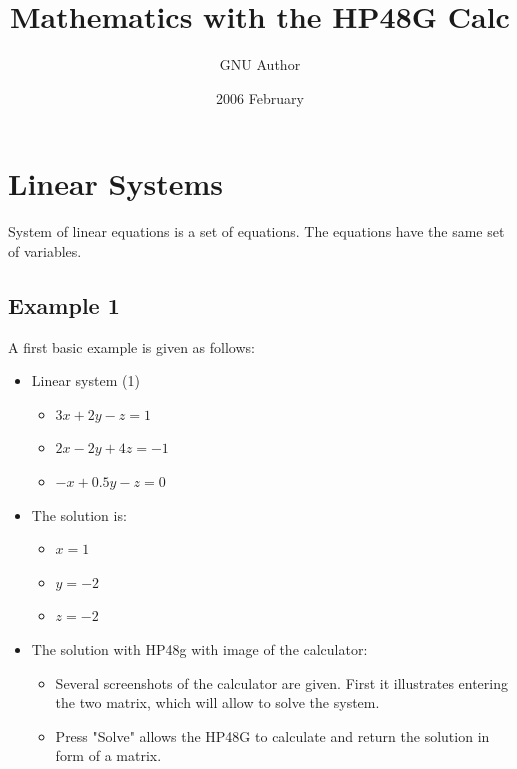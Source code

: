 \documentclass[11pt]{article}
\begin{document}
\title{Mathematics with the HP48G Calc}
\author{GNU Author}
\date{2006 February}
\maketitle

\section{Linear Systems}
System of linear equations is a set of equations. The equations have the same set of variables.

\subsection{Example 1}
A first basic example is given as follows:
\begin{itemize}
\item Linear system (1)
\begin{itemize}
\item $ 3x + 2y   -z = 1 $
\item $ 2x - 2y  +4z = -1 $
\item $ -x + 0.5y -z = 0 $
\end{itemize}
\end{itemize}


\begin{itemize}
\item The solution is:
\begin{itemize}
\item $ x = 1 $
\item $ y = -2 $
\item $ z = -2 $
\end{itemize}
\end{itemize}



\begin{itemize}
\item The solution with HP48g with image of the calculator:
\begin{itemize}
\item Several screenshots of the calculator are given. First it illustrates entering the two matrix, which will allow to solve the system.
\item Press "Solve" allows the HP48G to calculate and return the solution in form of a matrix.
\end{itemize}
\end{itemize}
\end{document}
